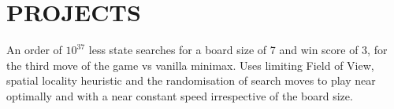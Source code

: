 \documentclass[]{deedy-resume-openfont}
\begin{document}
\begin{minipage}[t]{0.66\textwidth}




\section{PROJECTS}
\descript{}
\begin{tightemize}
        \item {An order of \(10^{37}\) less state searches for a board size of 7 and win score of 3, for the third move of the game vs vanilla minimax. Uses limiting Field of View, spatial locality heuristic and the  randomisation of search moves to play near optimally and with a near constant speed irrespective of the board size.}
\end{tightemize}
\sectionsep





\end{minipage}
\end{document}
